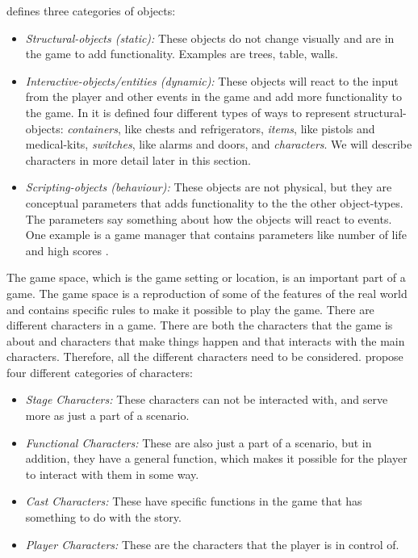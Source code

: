 \cite{beram} defines three categories of objects:
\begin{itemize}
\item \emph{Structural-objects (static):} These objects do not change visually and are in the game to add functionality. Examples are trees, table, walls.
\item \emph{Interactive-objects/entities (dynamic):} These objects will react to the input from the player and other events in the game and add more functionality to the game. In \cite{beram} it is defined four different types of ways to represent structural-objects: \emph{containers}, like chests and refrigerators, \emph{items}, like pistols and medical-kits, \emph{switches}, like alarms and doors, and \emph{characters}. We will describe characters in more detail later in this section. 
\item \emph{Scripting-objects (behaviour):} These objects are not physical, but they are conceptual parameters that adds functionality to the the other object-types. The parameters say something about how the objects will react to events. One example is a game manager that contains parameters like number of life and high scores \cite{umlapproach}. 
\end{itemize}

The game space, which is the game setting or location, is an important part of a game. The game space is a reproduction of some of the features of the real world and contains specific rules to make it possible to play the game. There are different characters in a game. There are both the characters that the game is about and characters that make things happen and that interacts with the main characters. Therefore, all the different characters need to be considered. \cite{understandingvg} propose four different categories of characters: 

\begin{itemize}
\item \emph{Stage Characters:} These characters can not be interacted with, and serve more as just a part of a scenario. \\
\item \emph{Functional Characters:} These are also just a part of a scenario, but in addition, they have a general function, which makes it possible for the player to interact with them in some way. \\
\item \emph{Cast Characters:} These have specific functions in the game that has something to do with the story. \\
\item \emph{Player Characters:} These are the characters that the player is in control of. 
\end{itemize}

